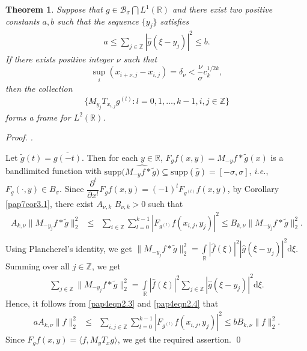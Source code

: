 \documentclass[a4paper,12pt,reqno]{amsart}
\theoremstyle{plain}
\newtheorem{thm}{Theorem}[section]
\numberwithin{equation}{section}
\theoremstyle{definition}
\newenvironment{pf}[1][]{%
 \vskip 3mm
 \noindent
 \ifthenelse{\equal{#1}{}}%
  {{\slshape Proof. }}%
  {{\slshape #1.} }%
 }%
{\qed\bigskip}
\newcommand{\ds}{\displaystyle}
\begin{document}
\begin{thm}\label{pap2thm5.2}
Suppose that $g\in \mathcal{B}_\sigma\bigcap L^1(\mathbb{R})$ and there exist two positive constants $a,b$ such that the sequence $\{y_j\}$ satisfies
\begin{eqnarray}\label{pap4eqn2.3}
a\leq\sum\limits_{j\in\mathbb{Z}}|\widehat{g}(\xi-y_j)|^2\leq b.
\end{eqnarray}
If there exists positive integer $\nu$ such that 
$$\sup\limits_i(x_{i+\nu,j}-x_{i,j})=\delta_\nu<\dfrac{\nu}{\sigma}c_k^{1/2k},$$ 
then the collection
\begin{eqnarray*}
\Big\{M_{y_j}T_{x_{i,j}}g^{(l)}:l=0, 1, \dots,k-1, i, j\in\mathbb{Z}\Big\}
\end{eqnarray*}
forms a frame for $L^2(\mathbb{R})$.
\end{thm}
\begin{pf}
Let $\widetilde{g}(t)=\overline{g(-t)}$. Then for each $y\in\mathbb{R}$, $F_gf(x,y)=M_{-y}f*\widetilde{g}(x)$ is a bandlimited function with
$\text{supp}(\widehat{M_{-y}f*\widetilde{g})}\subseteq\text{supp}(\widehat{g})=[-\sigma,\sigma]$, \textit{i.e.}, $F_g(\cdot,y)\in B_\sigma$.
Since $\dfrac{\partial^l}{\partial x^l}F_gf(x,y)=(-1)^lF_{g^{(l)}}f(x,y)$, by Corollary \ref{pap7cor3.1}, there exist 
$A_{\nu,k}$  $B_{\nu,k}>0$ such that
\begin{eqnarray}\label{pap4eqn2.4}
A_{k,\nu}\|M_{-y_j}f*\widetilde{g}\|^2_2&\leq&\ds\sum\limits_{i\in\mathbb{Z}}
\ds\sum\limits_{l=0}^{k-1}|F_{g^{(l)}}f(x_{i,j},y_j)|^2\leq B_{k,\nu}\|M_{-y_j}f*\widetilde{g}\|^2_2.\nonumber\\
\end{eqnarray}
Using Plancherel's identity, we get $\|M_{-y_j}f*\widetilde{g}\|^2_2=\ds\int\limits_{\mathbb{R}}|\widehat{f}(\xi)|^2|\widehat{g}(\xi-y_j)|^2\mathrm{d}\xi$.
Summing over all $j\in\mathbb{Z}$, we get
\begin{eqnarray}
\sum\limits_{j\in\mathbb{Z}}\|M_{-y_j}f*\widetilde{g}\|^2_2=\int\limits_{\mathbb{R}}|\widehat{f}(\xi)|^2
\sum\limits_{j\in\mathbb{Z}}|\widehat{g}(\xi-y_j)|^2\mathrm{d}\xi.
\end{eqnarray}
Hence, it follows from  \eqref{pap4eqn2.3} and \eqref{pap4eqn2.4} that
\begin{eqnarray*}
aA_{k,\nu}\|f\|^2_2&\leq&\ds\sum\limits_{i,j\in\mathbb{Z}}
\ds\sum\limits_{l=0}^{k-1}|F_{g^{(l)}}f(x_{i,j},y_j)|^2\leq bB_{k,\nu}\|f\|^2_2.
\end{eqnarray*}
Since $F_gf(x,y)=\langle f, M_yT_xg \rangle$, we get the required assertion.
\end{pf}
\end{document}
